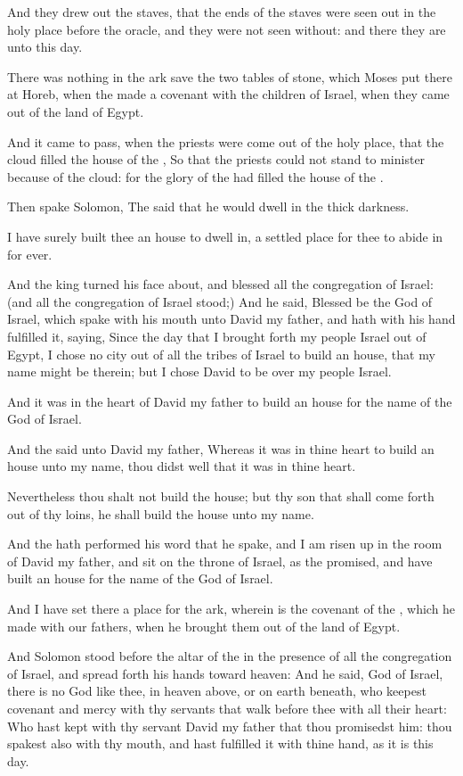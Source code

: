 \Verse And they drew out the staves, that the ends of the staves were seen out in the holy place before the oracle, and they were not seen without: and there they are unto this day.

\Verse There was nothing in the ark save the two tables of stone, which Moses put there at Horeb, when the \LORD made a covenant with the children of Israel, when they came out of the land of Egypt.

\Verse And it came to pass, when the priests were come out of the holy place, that the cloud filled the house of the \LORD, \Verse So that the priests could not stand to minister because of the cloud: for the glory of the \LORD had filled the house of the \LORD.

\Verse Then spake Solomon, The \LORD said that he would dwell in the thick darkness.

\Verse I have surely built thee an house to dwell in, a settled place for thee to abide in for ever.

\Verse And the king turned his face about, and blessed all the congregation of Israel: (and all the congregation of Israel stood;) \Verse And he said, Blessed be the \LORD God of Israel, which spake with his mouth unto David my father, and hath with his hand fulfilled it, saying, \Verse Since the day that I brought forth my people Israel out of Egypt, I chose no city out of all the tribes of Israel to build an house, that my name might be therein; but I chose David to be over my people Israel.

\Verse And it was in the heart of David my father to build an house for the name of the \LORD God of Israel.

\Verse And the \LORD said unto David my father, Whereas it was in thine heart to build an house unto my name, thou didst well that it was in thine heart.

\Verse Nevertheless thou shalt not build the house; but thy son that shall come forth out of thy loins, he shall build the house unto my name.

\Verse And the \LORD hath performed his word that he spake, and I am risen up in the room of David my father, and sit on the throne of Israel, as the \LORD promised, and have built an house for the name of the \LORD God of Israel.

\Verse And I have set there a place for the ark, wherein is the covenant of the \LORD, which he made with our fathers, when he brought them out of the land of Egypt.

\Verse And Solomon stood before the altar of the \LORD in the presence of all the congregation of Israel, and spread forth his hands toward heaven: \Verse And he said, \LORD God of Israel, there is no God like thee, in heaven above, or on earth beneath, who keepest covenant and mercy with thy servants that walk before thee with all their heart: \Verse Who hast kept with thy servant David my father that thou promisedst him: thou spakest also with thy mouth, and hast fulfilled it with thine hand, as it is this day.

